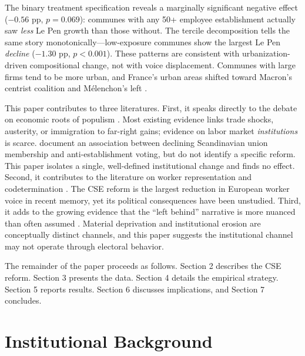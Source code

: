 \documentclass[12pt]{article}
\begin{document}
The binary treatment specification reveals a marginally significant negative effect ($-0.56$ pp, $p = 0.069$): communes with any 50+ employee establishment actually saw \textit{less} Le Pen growth than those without. The tercile decomposition tells the same story monotonically---low-exposure communes show the largest Le Pen \textit{decline} ($-1.30$ pp, $p < 0.001$). These patterns are consistent with urbanization-driven compositional change, not with voice displacement. Communes with large firms tend to be more urban, and France's urban areas shifted toward Macron's centrist coalition and M\'elenchon's left \citep{fourquet2019, piketty2018}.

This paper contributes to three literatures. First, it speaks directly to the debate on economic roots of populism \citep{autor2020, colantone2018, guiso2019, funke2023}. Most existing evidence links trade shocks, austerity, or immigration to far-right gains; evidence on labor market \textit{institutions} is scarce. \citet{persson2021} document an association between declining Scandinavian union membership and anti-establishment voting, but do not identify a specific reform. This paper isolates a single, well-defined institutional change and finds no effect. Second, it contributes to the literature on worker representation and codetermination \citep{jaeger2020, jaeger2022, frandsen2021}. The CSE reform is the largest reduction in European worker voice in recent memory, yet its political consequences have been unstudied. Third, it adds to the growing evidence that the ``left behind'' narrative is more nuanced than often assumed \citep{margalit2019, gidron2017}. Material deprivation and institutional erosion are conceptually distinct channels, and this paper suggests the institutional channel may not operate through electoral behavior.

The remainder of the paper proceeds as follows. Section 2 describes the CSE reform. Section 3 presents the data. Section 4 details the empirical strategy. Section 5 reports results. Section 6 discusses implications, and Section 7 concludes.


\section{Institutional Background}
\end{document}
